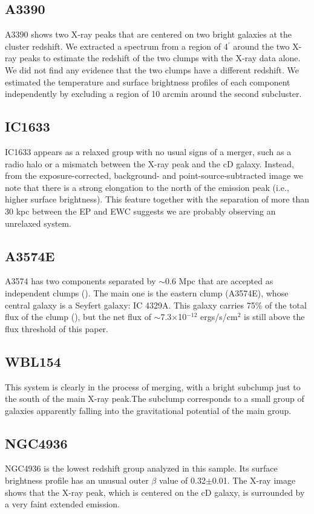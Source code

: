 \documentclass{aa} %
\begin{document}
\begin{appendix}
\subsection*{A3390}
A3390 shows two X-ray peaks that are centered on two bright
galaxies at the cluster redshift. We extracted a spectrum from a
region of 4$^{\prime}$ around the two X-ray peaks to estimate the
redshift of the two clumps with the X-ray data alone. We did not find
any evidence that the two clumps have a different redshift. We estimated the temperature and surface brightness profiles of each component independently by excluding a region of 10 arcmin around the second subcluster.

\subsection*{IC1633}
IC1633 appears as a relaxed group with no usual signs of a
merger, such as a radio halo or a mismatch between the X-ray peak and
the cD galaxy. Instead, from the exposure-corrected,
background- and point-source-subtracted image we note that there is
a strong elongation to the north of the emission peak (i.e., higher
surface brightness). This feature together with the separation of
more than 30 kpc between the EP and EWC suggests we are probably observing an unrelaxed system. 

\subsection*{A3574E}
A3574 has two components separated by $\sim$0.6 Mpc that are accepted as
independent clumps (\citealt{2004A&A...425..367B}).  The main one is the
eastern clump (A3574E), whose central galaxy is a Seyfert galaxy: IC 4329A. This
galaxy carries 75$\%$ of the total flux of the clump
(\citealt{2004A&A...425..367B}), but the net flux of $\sim$7.3$\times$10$^{-12}$ ergs/s/cm$^2$ is still above the flux
threshold of this paper. 

\subsection*{WBL154}
This system is clearly in the process of merging, with a bright
subclump just to the south of the main X-ray peak.The subclump
corresponds to a small group of galaxies apparently falling into the
gravitational potential of the main group. \\

\subsection*{NGC4936}
NGC4936 is the lowest redshift group analyzed in this sample.
Its surface brightness profile has an unusual outer $\beta$ value of 0.32$\pm$0.01. The X-ray image 
shows that the X-ray peak, which is centered on the cD galaxy, is surrounded by a very faint extended emission. 


\end{appendix}
\end{document}
